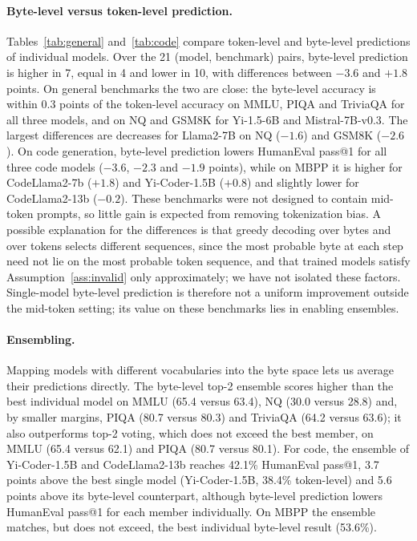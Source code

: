 \documentclass{article} %
\begin{document}
\paragraph{Byte-level versus token-level prediction.}
Tables~\ref{tab:general} and~\ref{tab:code} compare token-level and byte-level predictions of individual models. Over the 21 (model, benchmark) pairs, byte-level prediction is higher in 7, equal in 4 and lower in 10, with differences between $-3.6$ and $+1.8$ points. On general benchmarks the two are close: the byte-level accuracy is within 0.3 points of the token-level accuracy on MMLU, PIQA and TriviaQA for all three models, and on NQ and GSM8K for Yi-1.5-6B and Mistral-7B-v0.3. The largest differences are decreases for Llama2-7B on NQ ($-1.6$) and GSM8K ($-2.6$). On code generation, byte-level prediction lowers HumanEval pass@1 for all three code models ($-3.6$, $-2.3$ and $-1.9$ points), while on MBPP it is higher for CodeLlama2-7b ($+1.8$) and Yi-Coder-1.5B ($+0.8$) and slightly lower for CodeLlama2-13b ($-0.2$). These benchmarks were not designed to contain mid-token prompts, so little gain is expected from removing tokenization bias. A possible explanation for the differences is that greedy decoding over bytes and over tokens selects different sequences, since the most probable byte at each step need not lie on the most probable token sequence, and that trained models satisfy Assumption~\ref{ass:invalid} only approximately; we have not isolated these factors. Single-model byte-level prediction is therefore not a uniform improvement outside the mid-token setting; its value on these benchmarks lies in enabling ensembles.

\paragraph{Ensembling.}
Mapping models with different vocabularies into the byte space lets us average their predictions directly. The byte-level top-2 ensemble scores higher than the best individual model on MMLU (65.4 versus 63.4), NQ (30.0 versus 28.8) and, by smaller margins, PIQA (80.7 versus 80.3) and TriviaQA (64.2 versus 63.6); it also outperforms top-2 voting, which does not exceed the best member, on MMLU (65.4 versus 62.1) and PIQA (80.7 versus 80.1). For code, the ensemble of Yi-Coder-1.5B and CodeLlama2-13b reaches 42.1\% HumanEval pass@1, 3.7 points above the best single model (Yi-Coder-1.5B, 38.4\% token-level) and 5.6 points above its byte-level counterpart, although byte-level prediction lowers HumanEval pass@1 for each member individually. On MBPP the ensemble matches, but does not exceed, the best individual byte-level result (53.6\%).
\end{document}
